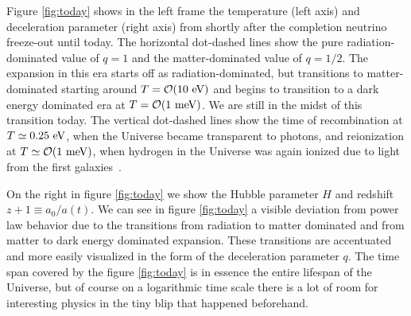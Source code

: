 Figure \ref{fig:today} shows in the left frame the temperature (left axis) and deceleration parameter (right axis) from shortly after the completion neutrino freeze-out until today. The horizontal dot-dashed lines show the pure radiation-dominated value of $q=1$ and the matter-dominated value of $q=1/2$. The expansion in this era starts off as radiation-dominated, but transitions to matter-dominated starting around $T=\mathcal{O}(10\text{ eV})$ and begins to transition to a dark energy dominated era at $T=\mathcal{O}(1\text{ meV})$. We are still in the midst of this transition today. The vertical dot-dashed lines show the time of recombination at $T\simeq0.25\text{ eV}$, when the Universe became transparent to photons, and reionization at $T\simeq {\cal O}(1\meV)$, when hydrogen in the Universe was again ionized due to light from the first galaxies~\cite{Zaroubi:2012in}. 

On the right in figure \ref{fig:today} we show the Hubble parameter $H$ and redshift $z+1\equiv a_0/a(t)$. We can see in figure \ref{fig:today} a visible deviation from power law behavior due to the transitions from radiation to matter dominated and from matter to dark energy dominated expansion. These transitions are accentuated and more easily visualized in the form of the deceleration parameter $q$. The time span covered by the figure \ref{fig:today} is in essence the entire lifespan of the Universe, but of course on a logarithmic time scale there is a lot of room for interesting physics in the tiny blip that happened beforehand.


